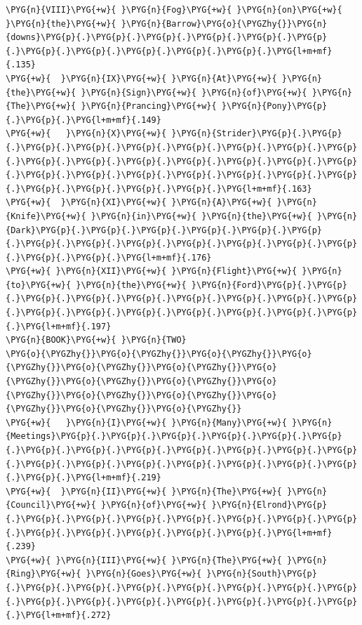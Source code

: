 \begin{codeblockbg}
\begin{Verbatim}[commandchars=\\\{\},breaklines=true,breakanywhere=true,fontsize=\codefont,xleftmargin=17bp]
\PYG{n}{VIII}\PYG{+w}{ }\PYG{n}{Fog}\PYG{+w}{ }\PYG{n}{on}\PYG{+w}{ }\PYG{n}{the}\PYG{+w}{ }\PYG{n}{Barrow}\PYG{o}{\PYGZhy{}}\PYG{n}{downs}\PYG{p}{.}\PYG{p}{.}\PYG{p}{.}\PYG{p}{.}\PYG{p}{.}\PYG{p}{.}\PYG{p}{.}\PYG{p}{.}\PYG{p}{.}\PYG{p}{.}\PYG{p}{.}\PYG{l+m+mf}{.135}
\PYG{+w}{  }\PYG{n}{IX}\PYG{+w}{ }\PYG{n}{At}\PYG{+w}{ }\PYG{n}{the}\PYG{+w}{ }\PYG{n}{Sign}\PYG{+w}{ }\PYG{n}{of}\PYG{+w}{ }\PYG{n}{The}\PYG{+w}{ }\PYG{n}{Prancing}\PYG{+w}{ }\PYG{n}{Pony}\PYG{p}{.}\PYG{p}{.}\PYG{l+m+mf}{.149}
\PYG{+w}{   }\PYG{n}{X}\PYG{+w}{ }\PYG{n}{Strider}\PYG{p}{.}\PYG{p}{.}\PYG{p}{.}\PYG{p}{.}\PYG{p}{.}\PYG{p}{.}\PYG{p}{.}\PYG{p}{.}\PYG{p}{.}\PYG{p}{.}\PYG{p}{.}\PYG{p}{.}\PYG{p}{.}\PYG{p}{.}\PYG{p}{.}\PYG{p}{.}\PYG{p}{.}\PYG{p}{.}\PYG{p}{.}\PYG{p}{.}\PYG{p}{.}\PYG{p}{.}\PYG{p}{.}\PYG{p}{.}\PYG{p}{.}\PYG{p}{.}\PYG{p}{.}\PYG{l+m+mf}{.163}
\PYG{+w}{  }\PYG{n}{XI}\PYG{+w}{ }\PYG{n}{A}\PYG{+w}{ }\PYG{n}{Knife}\PYG{+w}{ }\PYG{n}{in}\PYG{+w}{ }\PYG{n}{the}\PYG{+w}{ }\PYG{n}{Dark}\PYG{p}{.}\PYG{p}{.}\PYG{p}{.}\PYG{p}{.}\PYG{p}{.}\PYG{p}{.}\PYG{p}{.}\PYG{p}{.}\PYG{p}{.}\PYG{p}{.}\PYG{p}{.}\PYG{p}{.}\PYG{p}{.}\PYG{p}{.}\PYG{p}{.}\PYG{l+m+mf}{.176}
\PYG{+w}{ }\PYG{n}{XII}\PYG{+w}{ }\PYG{n}{Flight}\PYG{+w}{ }\PYG{n}{to}\PYG{+w}{ }\PYG{n}{the}\PYG{+w}{ }\PYG{n}{Ford}\PYG{p}{.}\PYG{p}{.}\PYG{p}{.}\PYG{p}{.}\PYG{p}{.}\PYG{p}{.}\PYG{p}{.}\PYG{p}{.}\PYG{p}{.}\PYG{p}{.}\PYG{p}{.}\PYG{p}{.}\PYG{p}{.}\PYG{p}{.}\PYG{p}{.}\PYG{p}{.}\PYG{l+m+mf}{.197}
\PYG{n}{BOOK}\PYG{+w}{ }\PYG{n}{TWO}
\PYG{o}{\PYGZhy{}}\PYG{o}{\PYGZhy{}}\PYG{o}{\PYGZhy{}}\PYG{o}{\PYGZhy{}}\PYG{o}{\PYGZhy{}}\PYG{o}{\PYGZhy{}}\PYG{o}{\PYGZhy{}}\PYG{o}{\PYGZhy{}}\PYG{o}{\PYGZhy{}}\PYG{o}{\PYGZhy{}}\PYG{o}{\PYGZhy{}}\PYG{o}{\PYGZhy{}}\PYG{o}{\PYGZhy{}}\PYG{o}{\PYGZhy{}}\PYG{o}{\PYGZhy{}}
\PYG{+w}{   }\PYG{n}{I}\PYG{+w}{ }\PYG{n}{Many}\PYG{+w}{ }\PYG{n}{Meetings}\PYG{p}{.}\PYG{p}{.}\PYG{p}{.}\PYG{p}{.}\PYG{p}{.}\PYG{p}{.}\PYG{p}{.}\PYG{p}{.}\PYG{p}{.}\PYG{p}{.}\PYG{p}{.}\PYG{p}{.}\PYG{p}{.}\PYG{p}{.}\PYG{p}{.}\PYG{p}{.}\PYG{p}{.}\PYG{p}{.}\PYG{p}{.}\PYG{p}{.}\PYG{p}{.}\PYG{l+m+mf}{.219}
\PYG{+w}{  }\PYG{n}{II}\PYG{+w}{ }\PYG{n}{The}\PYG{+w}{ }\PYG{n}{Council}\PYG{+w}{ }\PYG{n}{of}\PYG{+w}{ }\PYG{n}{Elrond}\PYG{p}{.}\PYG{p}{.}\PYG{p}{.}\PYG{p}{.}\PYG{p}{.}\PYG{p}{.}\PYG{p}{.}\PYG{p}{.}\PYG{p}{.}\PYG{p}{.}\PYG{p}{.}\PYG{p}{.}\PYG{p}{.}\PYG{l+m+mf}{.239}
\PYG{+w}{ }\PYG{n}{III}\PYG{+w}{ }\PYG{n}{The}\PYG{+w}{ }\PYG{n}{Ring}\PYG{+w}{ }\PYG{n}{Goes}\PYG{+w}{ }\PYG{n}{South}\PYG{p}{.}\PYG{p}{.}\PYG{p}{.}\PYG{p}{.}\PYG{p}{.}\PYG{p}{.}\PYG{p}{.}\PYG{p}{.}\PYG{p}{.}\PYG{p}{.}\PYG{p}{.}\PYG{p}{.}\PYG{p}{.}\PYG{p}{.}\PYG{p}{.}\PYG{l+m+mf}{.272}

\end{Verbatim}
\end{codeblockbg}
